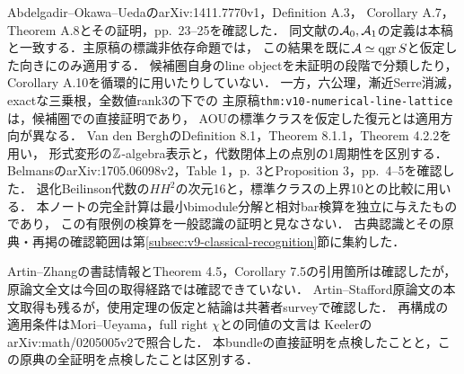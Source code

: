 \documentclass[11pt,a4paper]{ltjsarticle}
\begin{document}
\begin{description}[style=nextline]
\item[標準クラスの定義・標識・退化例に関する確認]
Abdelgadir--Okawa--Ueda\cite{AOUCompact}のarXiv:1411.7770v1，Definition A.3，
Corollary A.7，Theorem A.8とその証明，pp.~23--25を確認した．
同文献の$\mathcal A_0,\mathcal A_1$の定義は本稿と一致する．主原稿の標識非依存命題では，
この結果を既に$\mathcal A\simeq\operatorname{qgr} S$と仮定した向きにのみ適用する．
候補圏自身のline objectを未証明の段階で分類したり，Corollary A.10を循環的に用いたりしていない．
一方，六公理，漸近Serre消滅，exactな三乗根，全数値rank3の下での
主原稿\texttt{thm:v10-numerical-line-lattice}は，候補圏での直接証明であり，
AOUの標準クラスを仮定した復元とは適用方向が異なる．
Van den Bergh\cite{VdBquad}のDefinition 8.1，Theorem 8.1.1，Theorem 4.2.2を用い，
形式変形の$\mathbb Z$-algebra表示と，代数閉体上の点別の1周期性を区別する．
Belmans\cite{BelmansHHPlanes}のarXiv:1705.06098v2，Table 1，p.~3とProposition 3，pp.~4--5を確認した．
退化Beilinson代数の$HH^2$の次元16と，標準クラスの上界10との比較に用いる．
本ノートの完全計算は最小bimodule分解と相対bar検算を独立に与えたものであり，
この有限例の検算を一般認識の証明と見なさない．
古典認識とその原典・再掲の確認範囲は第\ref{subsec:v9-classical-recognition}節に集約した．

\item[原論文全文の確認が残る引用]
Artin--Zhang\cite{AZ}の書誌情報とTheorem 4.5，Corollary 7.5の引用箇所は確認したが，
原論文全文は今回の取得経路では確認できていない．
Artin--Stafford原論文の本文取得も残るが，使用定理の仮定と結論は共著者surveyで確認した．
再構成の適用条件はMori--Ueyama，full right $\chi$との同値の文言は
Keeler\cite[Theorem 2.5]{Keeler}のarXiv:math/0205005v2で照合した．
本bundleの直接証明を点検したことと，この原典の全証明を点検したことは区別する．


\end{description}
\end{document}
